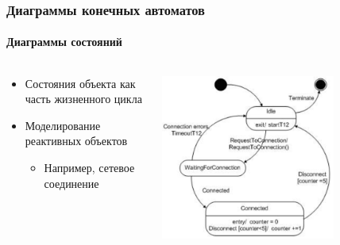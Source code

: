 \documentclass[xetex,mathserif,serif]{beamer}
\begin{document}
    \begin{frame}
        \frametitle{Диаграммы конечных автоматов}
        \framesubtitle{Диаграммы состояний}
        \begin{columns}
            \begin{column}{0.4\textwidth}
                \begin{itemize}
                    \item Состояния объекта как часть жизненного цикла
                    \item Моделирование реактивных объектов
                    \begin{itemize}
                        \item Например, сетевое соединение
                    \end{itemize}
                \end{itemize}
            \end{column}
            \begin{column}{0.6\textwidth}
                \begin{center}
                    \includegraphics[width=0.7\textwidth]{stateTransitionExample.png}
                \end{center}
            \end{column}
        \end{columns}
    \end{frame}
\end{document}

